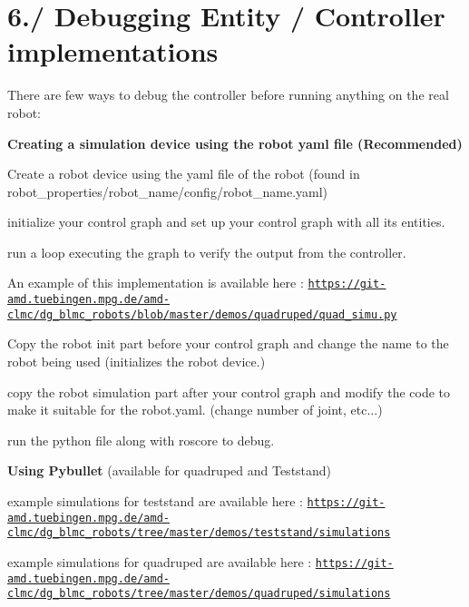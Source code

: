 \hypertarget{subpage_debugging_debug_sec_entity_impl}{}\section{6./ Debugging Entity / Controller implementations}\label{subpage_debugging_debug_sec_entity_impl}
There are few ways to debug the controller before running anything on the real robot\+:
\begin{DoxyEnumerate}
\item {\bfseries  Creating a simulation device using the robot yaml file (Recommended) }
\begin{DoxyEnumerate}
\item Create a robot device using the yaml file of the robot (found in robot\+\_\+properties/robot\+\_\+name/config/robot\+\_\+name.\+yaml)
\item initialize your control graph and set up your control graph with all its entities.
\item run a loop executing the graph to verify the output from the controller.
\item An example of this implementation is available here \+: \href{https://git-amd.tuebingen.mpg.de/amd-clmc/dg_blmc_robots/blob/master/demos/quadruped/quad_simu.py}{\tt https\+://git-\/amd.\+tuebingen.\+mpg.\+de/amd-\/clmc/dg\+\_\+blmc\+\_\+robots/blob/master/demos/quadruped/quad\+\_\+simu.\+py}
\begin{DoxyEnumerate}
\item Copy the robot init part before your control graph and change the name to the robot being used (initializes the robot device.)
\item copy the robot simulation part after your control graph and modify the code to make it suitable for the robot.\+yaml. (change number of joint, etc...)
\item run the python file along with roscore to debug.
\end{DoxyEnumerate}
\end{DoxyEnumerate}
\item {\bfseries  Using Pybullet } (available for quadruped and Teststand)
\begin{DoxyEnumerate}
\item example simulations for teststand are available here \+: \href{https://git-amd.tuebingen.mpg.de/amd-clmc/dg_blmc_robots/tree/master/demos/teststand/simulations}{\tt https\+://git-\/amd.\+tuebingen.\+mpg.\+de/amd-\/clmc/dg\+\_\+blmc\+\_\+robots/tree/master/demos/teststand/simulations}
\item example simulations for quadruped are available here \+: \href{https://git-amd.tuebingen.mpg.de/amd-clmc/dg_blmc_robots/tree/master/demos/quadruped/simulations}{\tt https\+://git-\/amd.\+tuebingen.\+mpg.\+de/amd-\/clmc/dg\+\_\+blmc\+\_\+robots/tree/master/demos/quadruped/simulations}

\end{DoxyEnumerate}
\end{DoxyEnumerate}
